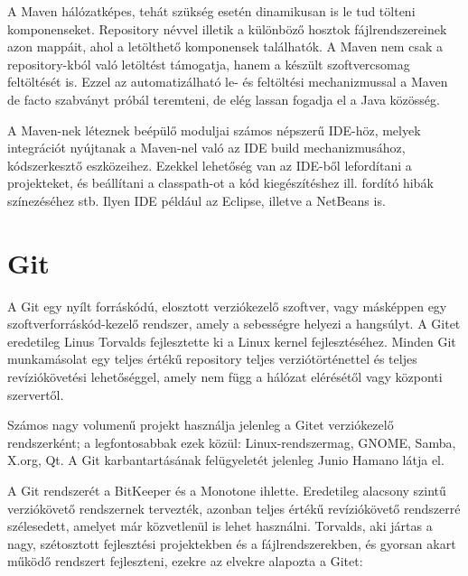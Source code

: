 \documentclass[a4paper,12pt]{report}
\begin{document}
\vspace{2mm}
A Maven hálózatképes, tehát szükség esetén dinamikusan is le tud tölteni komponenseket. Repository névvel illetik a különböző hosztok fájlrendszereinek azon mappáit, ahol a letölthető komponensek találhatók. A Maven nem csak a repository-kból való letöltést támogatja, hanem a készült szoftvercsomag feltöltését is. Ezzel az automatizálható le- és feltöltési mechanizmussal a Maven de facto szabványt próbál teremteni, de elég lassan fogadja el a Java közösség.

\vspace{2mm}
A Maven-nek léteznek beépülő moduljai számos népszerű IDE-höz, melyek integrációt nyújtanak a Maven-nel való az IDE build mechanizmusához, kódszerkesztő eszközeihez. Ezekkel lehetőség van az IDE-ből lefordítani a projekteket, és beállítani a classpath-ot a kód kiegészítéshez ill. fordító hibák színezéséhez stb. Ilyen IDE például az Eclipse, illetve a NetBeans is.

\newpage
\section{Git}
\label{git}

A Git egy nyílt forráskódú, elosztott verziókezelő szoftver, vagy másképpen egy szoftverforráskód-kezelő rendszer, amely a sebességre helyezi a hangsúlyt. A Gitet eredetileg Linus Torvalds fejlesztette ki a Linux kernel fejlesztéséhez. Minden Git munkamásolat egy teljes értékű repository teljes verziótörténettel és teljes revíziókövetési lehetőséggel, amely nem függ a hálózat elérésétől vagy központi szervertől.

\vspace{2mm}
Számos nagy volumenű projekt használja jelenleg a Gitet verziókezelő rendszerként; a legfontosabbak ezek közül: Linux-rendszermag, GNOME, Samba, X.org, Qt. A Git karbantartásának felügyeletét jelenleg Junio Hamano látja el.

\vspace{2mm}
A Git rendszerét a BitKeeper és a Monotone ihlette. Eredetileg alacsony szintű verziókövető rendszernek tervezték, azonban teljes értékű revíziókövető rendszerré szélesedett, amelyet már közvetlenül is lehet használni. Torvalds, aki jártas a nagy, szétosztott fejlesztési projektekben és a fájlrendszerekben, és gyorsan akart működő rendszert fejleszteni, ezekre az elvekre alapozta a Gitet:
\end{document}
